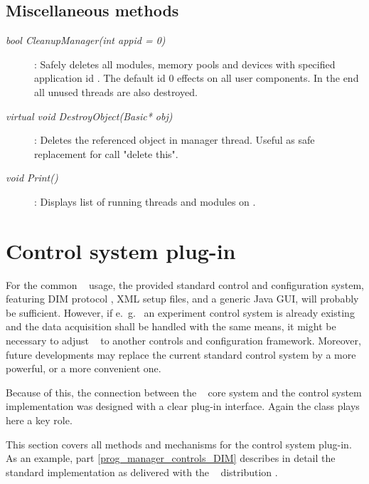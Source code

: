 \subsection{Miscellaneous methods}
	 
\begin{description}	
 
\item[\em bool CleanupManager\small (int appid = 0) ] :
Safely deletes all modules, memory pools and devices with
specified application id . The default id 0 effects 
on all user components. In the end all unused threads are also 
destroyed. 
 
\item[\em virtual void DestroyObject\small (Basic* obj)] :
Deletes the referenced object  in manager thread.
Useful as safe replacement for call "delete this".

\item[\em void Print()] :
Displays list of running threads and modules on .


\end{description}




\section{Control system plug-in}
\label{prog_manager_controls}
For the common \dabc~ usage, the provided standard control and configuration system,
featuring DIM protocol \cite{DIM}, XML setup files, and a generic Java GUI,
will probably be sufficient.
However, if e.~g.~
an experiment control system is already existing and the data acquisition
shall be handled with the same means,
it might be necessary to adjust \dabc~ to another
controls and configuration framework.
Moreover, future developments may replace the current standard control
system by a more powerful, or a more convenient one.

Because of this, the connection between the \dabc~ core system and the
control system implementation was designed with a clear plug-in interface.
Again the  class plays here a key role.

This section covers all methods and mechanisms for
the control system plug-in. As an example, part \ref{prog_manager_controls_DIM}  
describes in detail the standard implementation as delivered with the \dabc~ distribution .



